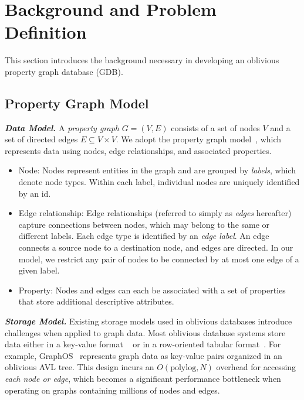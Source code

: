 \section{Background and Problem Definition}
\label{sec:background}

This section introduces the background necessary in developing
an oblivious property graph database (GDB).

\subsection{Property Graph Model}
\label{sec:background:graph}

\noindent\textit{\textbf{Data Model.}} A \emph{property graph} $G = (V, E)$ consists of a set of nodes $V$ and a set of directed 
edges $E \subseteq V \times V$. We adopt the property graph model~\cite{robinson2015graph}, 
which represents data using nodes, edge relationships, and associated properties.

\begin{itemize}[leftmargin=*]
\item {Node:} Nodes represent entities in the graph and are grouped by \textit{labels}, 
which denote node types. Within each label, individual nodes are uniquely identified by an id.

\item {Edge relationship:} Edge relationships (referred to simply as \textit{edges} 
hereafter) capture connections between nodes, which may belong to the same or different labels. 
Each edge type is identified by an \textit{edge label}. An edge connects a source node to a 
destination node, and edges are directed. In our model, we restrict any pair of nodes to be 
connected by at most one edge of a given label.

\item {Property:} Nodes and edges can each be associated with a set of properties that store additional descriptive attributes.
\end{itemize}


\noindent\textit{\textbf{Storage Model.}} 
Existing storage models used in oblivious databases introduce challenges when applied to graph 
data. Most oblivious database systems store data either in a key-value format 
~\cite{dauterman2021snoopy, mishra2018oblix} or in a row-oriented tabular 
format~\cite{zheng2017opaque,eskandarian2019oblidb,mavrogiannakis2025obliviator}. For example, 
GraphOS~\cite{chamani2023graphos} represents graph data as key-value pairs organized in an 
oblivious AVL tree. This design incurs an $O(\mathrm{polylog},N)$ overhead for accessing 
\textit{each node or edge}, which becomes a significant performance bottleneck when operating 
on graphs containing millions of nodes and edges.


